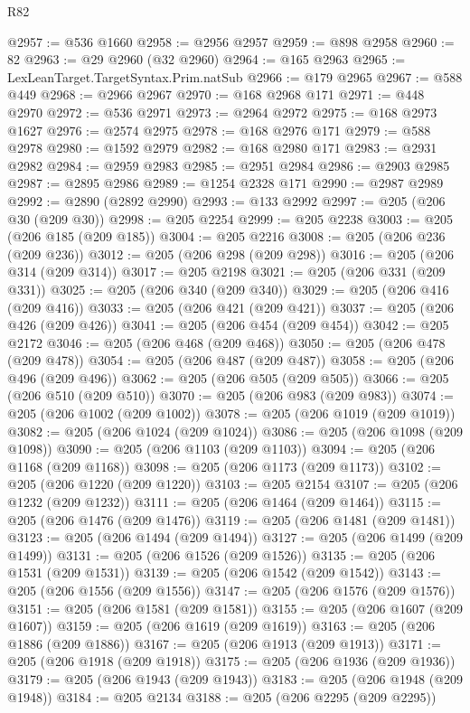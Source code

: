 \begin{lexlean}{R82}
\begin{coremodule}
@2957 := @536 @1660
@2958 := @2956 @2957
@2959 := @898 @2958
@2960 := 82
@2963 := @29 @2960 (@32 @2960)
@2964 := @165 @2963
@2965 := LexLeanTarget.TargetSyntax.Prim.natSub
@2966 := @179 @2965
@2967 := @588 @449
@2968 := @2966 @2967
@2970 := @168 @2968 @171
@2971 := @448 @2970
@2972 := @536 @2971
@2973 := @2964 @2972
@2975 := @168 @2973 @1627
@2976 := @2574 @2975
@2978 := @168 @2976 @171
@2979 := @588 @2978
@2980 := @1592 @2979
@2982 := @168 @2980 @171
@2983 := @2931 @2982
@2984 := @2959 @2983
@2985 := @2951 @2984
@2986 := @2903 @2985
@2987 := @2895 @2986
@2989 := @1254 @2328 @171
@2990 := @2987 @2989
@2992 := @2890 (@2892 @2990)
@2993 := @133 @2992
@2997 := @205 (@206 @30 (@209 @30))
@2998 := @205 @2254
@2999 := @205 @2238
@3003 := @205 (@206 @185 (@209 @185))
@3004 := @205 @2216
@3008 := @205 (@206 @236 (@209 @236))
@3012 := @205 (@206 @298 (@209 @298))
@3016 := @205 (@206 @314 (@209 @314))
@3017 := @205 @2198
@3021 := @205 (@206 @331 (@209 @331))
@3025 := @205 (@206 @340 (@209 @340))
@3029 := @205 (@206 @416 (@209 @416))
@3033 := @205 (@206 @421 (@209 @421))
@3037 := @205 (@206 @426 (@209 @426))
@3041 := @205 (@206 @454 (@209 @454))
@3042 := @205 @2172
@3046 := @205 (@206 @468 (@209 @468))
@3050 := @205 (@206 @478 (@209 @478))
@3054 := @205 (@206 @487 (@209 @487))
@3058 := @205 (@206 @496 (@209 @496))
@3062 := @205 (@206 @505 (@209 @505))
@3066 := @205 (@206 @510 (@209 @510))
@3070 := @205 (@206 @983 (@209 @983))
@3074 := @205 (@206 @1002 (@209 @1002))
@3078 := @205 (@206 @1019 (@209 @1019))
@3082 := @205 (@206 @1024 (@209 @1024))
@3086 := @205 (@206 @1098 (@209 @1098))
@3090 := @205 (@206 @1103 (@209 @1103))
@3094 := @205 (@206 @1168 (@209 @1168))
@3098 := @205 (@206 @1173 (@209 @1173))
@3102 := @205 (@206 @1220 (@209 @1220))
@3103 := @205 @2154
@3107 := @205 (@206 @1232 (@209 @1232))
@3111 := @205 (@206 @1464 (@209 @1464))
@3115 := @205 (@206 @1476 (@209 @1476))
@3119 := @205 (@206 @1481 (@209 @1481))
@3123 := @205 (@206 @1494 (@209 @1494))
@3127 := @205 (@206 @1499 (@209 @1499))
@3131 := @205 (@206 @1526 (@209 @1526))
@3135 := @205 (@206 @1531 (@209 @1531))
@3139 := @205 (@206 @1542 (@209 @1542))
@3143 := @205 (@206 @1556 (@209 @1556))
@3147 := @205 (@206 @1576 (@209 @1576))
@3151 := @205 (@206 @1581 (@209 @1581))
@3155 := @205 (@206 @1607 (@209 @1607))
@3159 := @205 (@206 @1619 (@209 @1619))
@3163 := @205 (@206 @1886 (@209 @1886))
@3167 := @205 (@206 @1913 (@209 @1913))
@3171 := @205 (@206 @1918 (@209 @1918))
@3175 := @205 (@206 @1936 (@209 @1936))
@3179 := @205 (@206 @1943 (@209 @1943))
@3183 := @205 (@206 @1948 (@209 @1948))
@3184 := @205 @2134
@3188 := @205 (@206 @2295 (@209 @2295))

\end{coremodule}
\end{lexlean}
